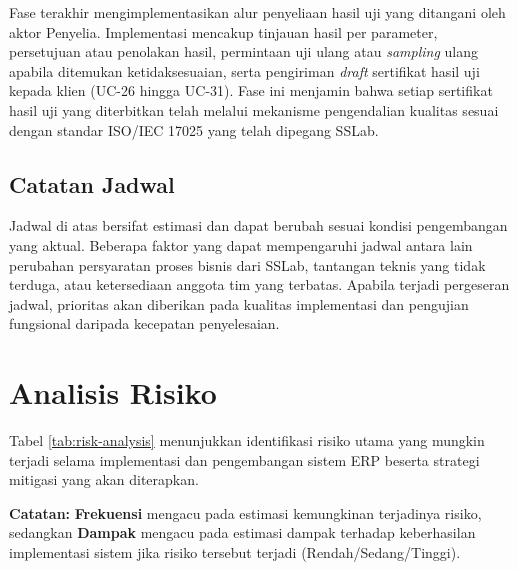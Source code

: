 Fase terakhir mengimplementasikan alur penyeliaan hasil uji yang ditangani oleh aktor Penyelia. Implementasi mencakup tinjauan hasil per parameter, persetujuan atau penolakan hasil, permintaan uji ulang atau \textit{sampling} ulang apabila ditemukan ketidaksesuaian, serta pengiriman \textit{draft} sertifikat hasil uji kepada klien (UC-26 hingga UC-31). Fase ini menjamin bahwa setiap sertifikat hasil uji yang diterbitkan telah melalui mekanisme pengendalian kualitas sesuai dengan standar ISO/IEC 17025 yang telah dipegang SSLab.

\subsection{Catatan Jadwal}

Jadwal di atas bersifat estimasi dan dapat berubah sesuai kondisi pengembangan yang aktual. Beberapa faktor yang dapat mempengaruhi jadwal antara lain perubahan persyaratan proses bisnis dari SSLab, tantangan teknis yang tidak terduga, atau ketersediaan anggota tim yang terbatas. Apabila terjadi pergeseran jadwal, prioritas akan diberikan pada kualitas implementasi dan pengujian fungsional daripada kecepatan penyelesaian.

\section{Analisis Risiko}

Tabel \ref{tab:risk-analysis} menunjukkan identifikasi risiko utama yang mungkin terjadi selama implementasi dan pengembangan sistem ERP beserta strategi mitigasi yang akan diterapkan.



\textbf{Catatan:} \textbf{Frekuensi} mengacu pada estimasi kemungkinan terjadinya risiko, sedangkan \textbf{Dampak} mengacu pada estimasi dampak terhadap keberhasilan implementasi sistem jika risiko tersebut terjadi (Rendah/Sedang/Tinggi).

